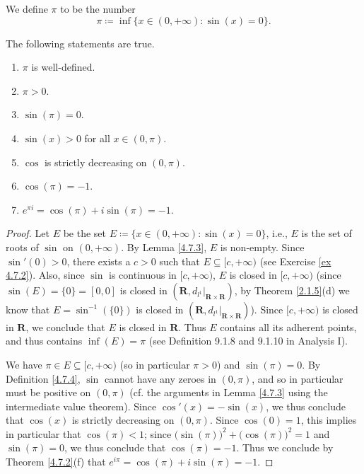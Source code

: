 \begin{definition}\label{4.7.4}
    We define \(\pi\) to be the number
    \[
        \pi \coloneqq \inf\{x \in (0, +\infty) : \sin(x) = 0\}.
    \]
\end{definition}

\begin{additional corollary}\label{ac 4.7.2}
The following statements are true.
\begin{enumerate}
    \item \(\pi\) is well-defined.
    \item \(\pi > 0\).
    \item \(\sin(\pi) = 0\).
    \item \(\sin(x) > 0\) for all \(x \in (0, \pi)\).
    \item \(\cos\) is strictly decreasing on \((0, \pi)\).
    \item \(\cos(\pi) = -1\).
    \item \(e^{\pi i} = \cos(\pi) + i \sin(\pi) = -1\).
\end{enumerate}
\end{additional corollary}

\begin{proof}
    Let \(E\) be the set \(E \coloneqq \{x \in (0, +\infty) : \sin(x) = 0\}\), i.e., \(E\) is the set of roots of \(\sin\) on \((0, +\infty)\).
    By Lemma \ref{4.7.3}, \(E\) is non-empty.
    Since \(\sin'(0) > 0\), there exists a \(c > 0\) such that \(E \subseteq [c, +\infty)\) (see Exercise \ref{ex 4.7.2}).
    Also, since \(\sin\) is continuous in \([c, +\infty)\), \(E\) is closed in \([c, +\infty)\)
    (since \(\sin(E) = \{0\} = [0, 0]\) is closed in \((\mathbf{R}, d_{l^1}|_{\mathbf{R} \times \mathbf{R}})\), by Theorem \ref{2.1.5}(d) we know that \(E = \sin^{-1}(\{0\})\) is closed in \((\mathbf{R}, d_{l^1}|_{\mathbf{R} \times \mathbf{R}})\)).
    Since \([c, +\infty)\) is closed in \(\mathbf{R}\), we conclude that \(E\) is closed in \(\mathbf{R}\).
    Thus \(E\) contains all its adherent points, and thus contains \(\inf(E) = \pi\) (see Definition 9.1.8 and 9.1.10 in Analysis I).

    We have \(\pi \in E \subseteq [c, +\infty)\) (so in particular \(\pi > 0\)) and \(\sin(\pi) = 0\).
    By Definition \ref{4.7.4}, \(\sin\) cannot have any zeroes in \((0, \pi)\), and so in particular must be positive on \((0, \pi)\)
    (cf. the arguments in Lemma \ref{4.7.3} using the intermediate value theorem).
    Since \(\cos'(x) = -\sin(x)\), we thus conclude that \(\cos(x)\) is strictly decreasing on \((0, \pi)\).
    Since \(\cos(0) = 1\), this implies in particular that \(\cos(\pi) < 1\);
    since \(\big(\sin(\pi)\big)^2 + \big(\cos(\pi)\big)^2 = 1\) and \(\sin(\pi) = 0\), we thus conclude that \(\cos(\pi) = -1\).
    Thus we conclude by Theorem \ref{4.7.2}(f) that \(e^{i \pi} = \cos(\pi) + i \sin(\pi) = -1\).
\end{proof}

